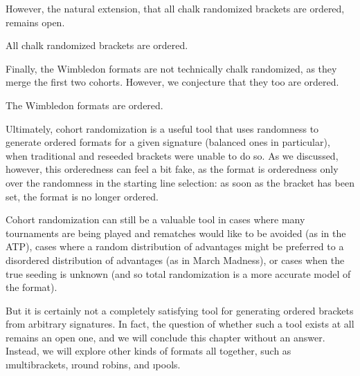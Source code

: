 {    

    However, the natural extension, that all chalk randomized brackets are ordered, remains open.

    \begin{conj}{}{}
        All chalk randomized brackets are ordered.
    \end{conj}

    Finally, the Wimbledon formats are not technically chalk randomized, as they merge the first two cohorts. However, we conjecture that they too are ordered.

    \begin{conj}{}{}
        The Wimbledon formats are ordered.
    \end{conj}

    Ultimately, cohort randomization is a useful tool that uses randomness to generate ordered formats for a given signature (balanced ones in particular), when traditional and reseeded brackets were unable to do so. As we discussed, however, this orderedness can feel a bit fake, as the format is orderedness only over the randomness in the starting line selection: as soon as the bracket has been set, the format is no longer ordered.

    Cohort randomization can still be a valuable tool in cases where many tournaments are being played and rematches would like to be avoided (as in the ATP), cases where a random distribution of advantages might be preferred to a disordered distribution of advantages (as in March Madness), or cases when the true seeding is unknown (and so total randomization is a more accurate model of the format).
    
    But it is certainly not a completely satisfying tool for generating ordered brackets from arbitrary signatures. In fact, the question of whether such a tool exists at all remains an open one, and we will conclude this chapter without an answer. Instead, we will explore other kinds of formats all together, such as \i{multibrackets}, \i{round robins}, and \i{pools}.






    
    
}